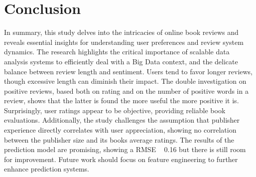 \section{Conclusion}

In summary, this study delves into the intricacies of online book reviews and reveals essential insights for
understanding user preferences and review system dynamics. The research highlights the critical importance of
scalable data analysis systems to efficiently deal with a Big Data context, and the delicate balance between review length and sentiment. Users tend to favor
longer reviews, though excessive length can diminish their impact. The double investigation on positive reviews, based both on
rating and on the number of positive words in a review, shows that the latter is found the more useful the more positive it is.
Surprisingly, user ratings
appear to be objective, providing reliable book evaluations.
Additionally, the study challenges the assumption that publisher experience directly correlates with user
appreciation, showing no correlation between the publisher size and its books average ratings.
The results of the prediction model are promising, showing a RMSE ~ 0.16 but there is still room for improvement.
Future work should focus on feature engineering to further enhance prediction systems.



